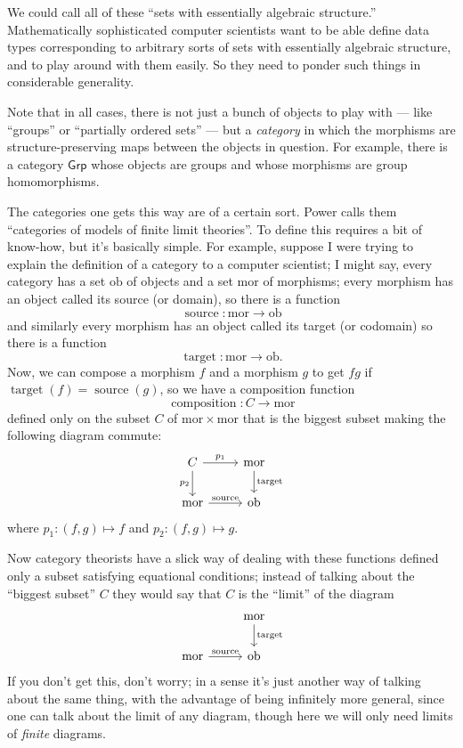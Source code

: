 \documentclass{article}
\begin{document}
We could call all of these ``sets with essentially algebraic
structure.'' Mathematically sophisticated computer scientists want to be
able define data types corresponding to arbitrary sorts of sets with
essentially algebraic structure, and to play around with them easily. So
they need to ponder such things in considerable generality.

Note that in all cases, there is not just a bunch of objects to play
with --- like ``groups'' or ``partially ordered sets'' --- but a
\emph{category} in which the morphisms are structure-preserving maps
between the objects in question. For example, there is a category
\(\mathsf{Grp}\) whose objects are groups and whose morphisms are group
homomorphisms.

The categories one gets this way are of a certain sort. Power calls them
``categories of models of finite limit theories''. To define this
requires a bit of know-how, but it's basically simple. For example,
suppose I were trying to explain the definition of a category to a
computer scientist; I might say, every category has a set
\(\mathrm{ob}\) of objects and a set \(\mathrm{mor}\) of morphisms;
every morphism has an object called its source (or domain), so there is
a function \[\operatorname{source}\colon\mathrm{mor}\to\mathrm{ob}\] and
similarly every morphism has an object called its target (or codomain)
so there is a function
\[\operatorname{target}\colon\mathrm{mor}\to\mathrm{ob}.\] Now, we can
compose a morphism \(f\) and a morphism \(g\) to get \(fg\) if
\(\operatorname{target}(f) = \operatorname{source}(g)\), so we have a
composition function
\[\operatorname{composition}\colon C\to\mathrm{mor}\] defined only on
the subset \(C\) of \(\mathrm{mor}\times\mathrm{mor}\) that is the
biggest subset making the following diagram commute: \[
  \begin{tikzcd}
    C \ar[r,"p_1"]
      \ar[d,swap,"p_2"]
    &\mathrm{mor} \ar[d,"\operatorname{target}"]
  \\\mathrm{mor} \ar[r,"\operatorname{source}"]
    &\mathrm{ob}
  \end{tikzcd}
\] where \(p_1\colon(f,g)\mapsto f\) and \(p_2\colon(f,g)\mapsto g\).

Now category theorists have a slick way of dealing with these functions
defined only a subset satisfying equational conditions; instead of
talking about the ``biggest subset'' \(C\) they would say that \(C\) is
the ``limit'' of the diagram \[
  \begin{tikzcd}
    &\mathrm{mor} \ar[d,"\operatorname{target}"]
  \\\mathrm{mor} \ar[r,"\operatorname{source}"]
    &\mathrm{ob}
  \end{tikzcd}
\] If you don't get this, don't worry; in a sense it's just another way
of talking about the same thing, with the advantage of being infinitely
more general, since one can talk about the limit of any diagram, though
here we will only need limits of \emph{finite} diagrams.
\end{document}
